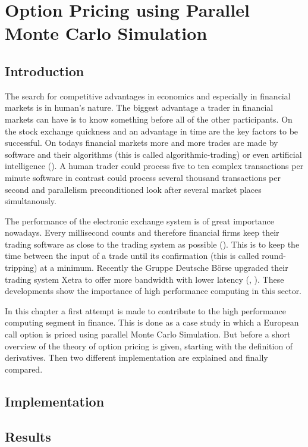 \chapter{Option Pricing using Parallel Monte Carlo Simulation}
\label{chap:options}
\section{Introduction}
\label{sec:optionintro}

The search for competitive advantages in economics and especially in
financial markets is in human's nature. The biggest advantage a trader
in financial markets can have is to know something before all of the
other participants. On the stock exchange quickness and an advantage
in time are the key factors to be successful. On todays financial
markets more and more trades are made by software and their
algorithms (this is called algorithmic-trading) or even artificial
intelligence (\cite{bloomberg:hal9000}). A human trader could
process five to ten complex 
transactions per minute software in contrast could process several
thousand transactions per second and parallelism preconditioned look
after several market places simultanously.


The performance of the electronic exchange system is of great
importance nowadays. Every millisecond counts and therefore financial
firms keep their trading software as close to the trading system as
possible (\cite{wstonline:cuttingedge}). This is to keep the time
between the input of a trade until its confirmation (this is called
round-tripping) at a minimum. Recently the Gruppe Deutsche B\"orse
upgraded their trading 
system Xetra to offer more bandwidth with lower latency (\cite{gdb:latency},
\cite{gdb:bandwidth}).
These developments show the importance of high performance computing
in this sector.


In this chapter a first attempt is made to contribute to the high performance
computing segment in finance. This is done as a case study in which a
European call option is priced using parallel Monte Carlo
Simulation. But before a short overview of the theory of option
pricing is given, starting with the definition of derivatives. Then
two different implementation are explained and finally compared.


\section{Implementation}
\section{Results}

